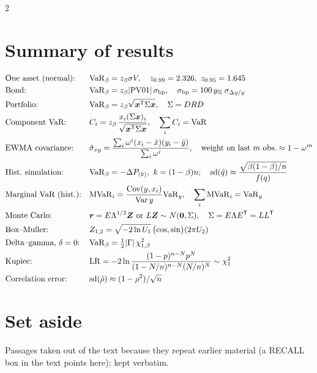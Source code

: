 \begin{paracol}{2}
\section*{Summary of results}
\begin{keyformulas}
\begin{align*}
&\text{One asset (normal):} && \mathrm{VaR}_\beta=z_\beta\sigma V,\quad z_{0.99}=2.326,\ z_{0.95}=1.645\\
&\text{Bond:} && \mathrm{VaR}_\beta=z_\beta|\mathrm{PV01}|\,\sigma_{\mathrm{bp}},\quad\sigma_{\mathrm{bp}}=100\,y_{\%}\,\sigma_{\Delta y/y}\\
&\text{Portfolio:} && \mathrm{VaR}_\beta=z_\beta\sqrt{\bm x^{\mathsf T}\Sigma\bm x},\quad\Sigma=DRD\\
&\text{Component VaR:} && C_i=z_\beta\,\frac{x_i(\Sigma\bm x)_i}{\sqrt{\bm x^{\mathsf T}\Sigma\bm x}},\quad\sum_iC_i=\mathrm{VaR}\\
&\text{EWMA covariance:} && \hat\sigma_{xy}=\frac{\sum_i\omega^i(x_i-\bar x)(y_i-\bar y)}{\sum_i\omega^i},\quad\text{weight on last }m\text{ obs.}\approx1-\omega^m\\
&\text{Hist.\ simulation:} && \mathrm{VaR}_\beta=-\Delta P_{(k)},\ k=(1-\beta)n;\quad\mathrm{sd}(\hat q)\approx\frac{\sqrt{\beta(1-\beta)/n}}{f(q)}\\
&\text{Marginal VaR (hist.):} && \mathrm{MVaR}_i=\frac{\operatorname{Cov}(y,x_i)}{\operatorname{Var} y}\mathrm{VaR}_y,\quad\sum_i\mathrm{MVaR}_i=\mathrm{VaR}_y\\
&\text{Monte Carlo:} && \bm r=E\Lambda^{1/2}\bm Z\ \text{or}\ L\bm Z\sim N(\bm0,\Sigma),\quad\Sigma=E\Lambda E^{\mathsf T}=LL^{\mathsf T}\\
&\text{Box--Muller:} && Z_{1,2}=\sqrt{-2\ln U_1}\,\bigl(\cos,\sin\bigr)(2\pi U_2)\\
&\text{Delta--gamma, }\delta=0\text{:} && \mathrm{VaR}_\beta=\tfrac12|\Gamma|\,\chi^2_{1,\beta}\\
&\text{Kupiec:} && \mathrm{LR}=-2\ln\frac{(1-p)^{n-N}p^N}{(1-N/n)^{n-N}(N/n)^N}\sim\chi^2_1\\
&\text{Correlation error:} && \mathrm{sd}(\hat\rho)\approx(1-\rho^2)/\sqrt n
\end{align*}
\end{keyformulas}

\section*{Set aside}\label{ch19:sec-setaside}
Passages taken out of the text because they repeat earlier material (a RECALL box in the text points here); kept verbatim.


\end{paracol}

